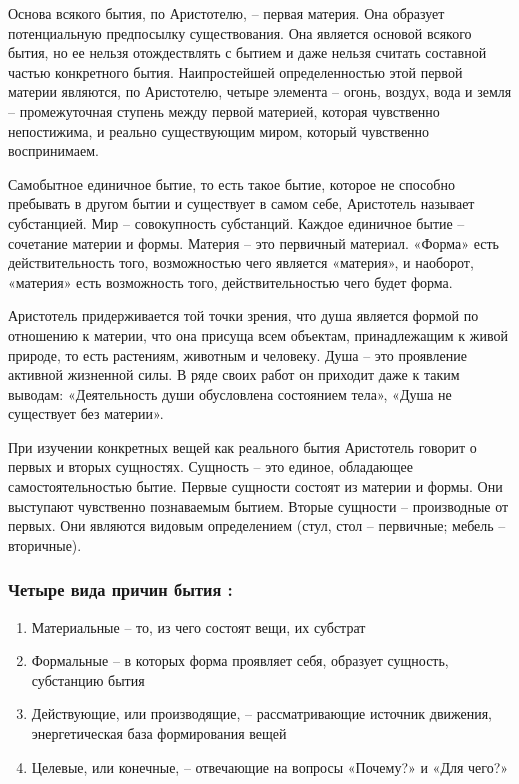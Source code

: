 \documentclass[a4paper, 14pt]{extreport}
\begin{document}
Основа всякого бытия, по Аристотелю, -- первая материя. Она образует
потенциальную предпосылку существования. Она является основой всякого
бытия, но ее нельзя отождествлять с бытием и даже нельзя считать
составной частью конкретного бытия. Наипростейшей определенностью этой
первой материи являются, по Аристотелю, четыре элемента -- огонь,
воздух, вода и земля -- промежуточная ступень между первой материей,
которая чувственно непостижима, и реально существующим миром, который
чувственно воспринимаем.

Самобытное единичное бытие, то есть такое бытие, которое не способно
пребывать в другом бытии и существует в самом себе, Аристотель называет
субстанцией. Мир -- совокупность субстанций. Каждое единичное бытие --
сочетание материи и формы. Материя -- это первичный материал. «Форма»
есть действительность того, возможностью чего является «материя», и
наоборот, «материя» есть возможность того, действительностью чего будет
форма.

Аристотель придерживается той точки зрения, что душа является формой по
отношению к материи, что она присуща всем объектам, принадлежащим к
живой природе, то есть растениям, животным и человеку. Душа -- это
проявление активной жизненной силы. В ряде своих работ он приходит даже
к таким выводам: «Деятельность души обусловлена состоянием тела», «Душа
не существует без материи».

При изучении конкретных вещей как реального бытия Аристотель говорит о
первых и вторых сущностях. Сущность -- это единое, обладающее
самостоятельностью бытие. Первые сущности состоят из материи и формы.
Они выступают чувственно познаваемым бытием. Вторые сущности --
производные от первых. Они являются видовым определением (стул, стол --
первичные; мебель -- вторичные).

\subsubsection{Четыре вида причин бытия :}

\begin{enumerate}
\def\labelenumi{\arabic{enumi}.}

\item
  Материальные -- то, из чего состоят вещи, их субстрат
\item
  Формальные -- в которых форма проявляет себя, образует сущность,
  субстанцию бытия
\item
  Действующие, или производящие, -- рассматривающие источник движения,
  энергетическая база формирования вещей
\item
  Целевые, или конечные, -- отвечающие на вопросы «Почему?» и «Для
  чего?»
\end{enumerate}
\end{document}
